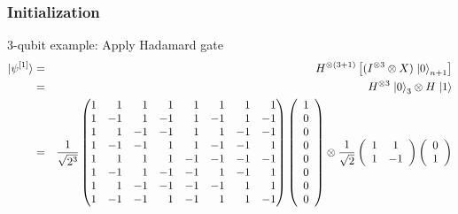 \begin{frame}
\frametitle{Initialization}
\begin{exampleblock}{3-qubit example: Apply Hadamard gate}
\begin{eqnarray}
\ket{\psi^{[1]}}&=&H^{\otimes\left(3+1\right)}\left[(I^{\otimes3}\otimes X)\left.|0\right\rangle _{n+1}\right]\nonumber\\
&=&H^{\otimes3}\left.|0\right\rangle_3 \otimes H\left.|1\right\rangle\nonumber\\
&=&\frac{1}{\sqrt{2^{3}}}\begin{pmatrix*}[r]
1 & 1 & 1 & 1 & 1 & 1 & 1 & 1\\
1 & -1 & 1 & -1 & 1 & -1 & 1 & -1\\
1 & 1 & -1 & -1 & 1 & 1 & -1 & -1\\
1 & -1 & -1 & 1 & 1 & -1 & -1 & 1\\
1 & 1 & 1 & 1 & -1 & -1 & -1 & -1\\
1 & -1 & 1 & -1 & -1 & 1 & -1 & 1\\
1 & 1 & -1 & -1 & -1 & -1 & 1 & 1\\
1 & -1 & -1 & 1 & -1 & 1 & 1 & -1
\end{pmatrix*}\left(\begin{array}{c}
1\\
0\\
0\\
0\\
0\\
0\\
0\\
0
\end{array}\right)\otimes\frac{1}{\sqrt{2}}\left(\begin{array}{cc}
1 & 1\\
1 & -1
\end{array}\right)\left(\begin{array}{c}
0\\
1
\end{array}\right)\nonumber
\end{eqnarray}
\end{exampleblock}
\end{frame}

